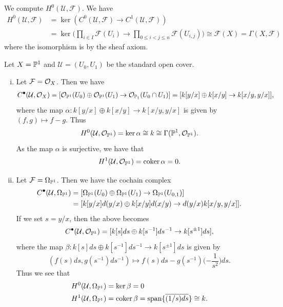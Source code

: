 \begin{example}
  We compute $H^0(\mathcal{U}, \mathcal{F})$.
  We have
  \begin{align*}
    H^0(\mathcal{U}, \mathcal{F})
    &= \ker(C^0(\mathcal{U}, \mathcal{F}) \to C^1(\mathcal{U}, \mathcal{F})) \\
    &= \ker\Big(
      \prod_{i \in I} \mathcal{F}(U_i)
      \to \prod_{0 \le i < j \le n} \mathcal{F}(U_{i, j})
    \Big)
    \cong \mathcal{F}(X)
    = \Gamma(X, \mathcal{F})
  \end{align*}
  where the isomorphism is by the sheaf
  axiom.
\end{example}

\begin{example}\label{ex:pp1}
  Let $X = \mathbb{P}^1$ and
  $\mathcal{U} = (U_0, U_1)$ be the
  standard open cover.
  \begin{enumerate}[(i)]
    \item Let $\mathcal{F} = \mathcal{O}_X$. Then
      we have
      \begin{align*}
        C^\bullet(\mathcal{U}, \mathcal{O}_X)
        = [\mathcal{O}_{\mathbb{P}^1}(U_0) \oplus \mathcal{O}_{\mathbb{P}^1}(U_1)
        \to \mathcal{O}_{\mathbb{P}_{1}}(U_0 \cap U_1)]
        = [k[y / x] \oplus k[x / y] \to k[x / y, y / x]],
      \end{align*}
      where the map $\alpha : k[y / x] \oplus k[x / y] \to k[x / y, y / x]$ is given by
      $(f, g) \mapsto f - g$. Thus
      \[
        H^0(\mathcal{U}, \mathcal{O}_{\mathbb{P}^1})
        = \ker \alpha \cong k \cong \Gamma(\mathbb{P}^1, \mathcal{O}_{\mathbb{P}^1}).
      \]
      As the map $\alpha$ is surjective,
      we have that
      \[
        H^1(\mathcal{U}, \mathcal{O}_{\mathbb{P}^1})
        = \operatorname{coker} \alpha = 0.
      \]
    \item Let $\mathcal{F} = \Omega_{\mathbb{P}^1}$.
      Then we have the cochain complex
      \begin{align*}
        C^\bullet(\mathcal{U}, \Omega_{\mathbb{P}^1})
        &= [\Omega_{\mathbb{P}^1}(U_0) \oplus \Omega_{\mathbb{P}^1}(U_1) \to \Omega_{\mathbb{P}^1}(U_{0, 1})] \\
        &= [k[y / x] d(y / x) \oplus k[x / y] d(x / y) \to d(y / x) k[x / y, y / x]].
      \end{align*}
      If we set $s = y / x$, then the above
      becomes
      \[
        C^\bullet(\mathcal{U}, \mathcal{O}_{\mathbb{P}^1})
        = [k[s] ds \oplus k[s^{-1}] ds^{-1} \to k[s^{\pm 1}] ds],
      \]
      where the map $\beta : k[s] ds \oplus k[s^{-1}] ds^{-1} \to k[s^{\pm 1}] ds$ is given by
      \[
        (f(s) ds, g(s^{-1}) ds^{-1})
        \longmapsto f(s) ds - g(s^{-1})\bigg({-\frac{1}{s^2}}\bigg) ds.
      \]
      Thus we see that
      \begin{align*}
        H^0(\mathcal{U}, \Omega_{\mathbb{P}^1})
        &= \ker \beta = 0 \\
        H^1(\mathcal{U}, \Omega_{\mathbb{P}^1})
        &= \operatorname{coker} \beta
        = \operatorname{span}\{\overline{(1 / s) ds}\}
        \cong k.
      \end{align*}
  \end{enumerate}
\end{example}

